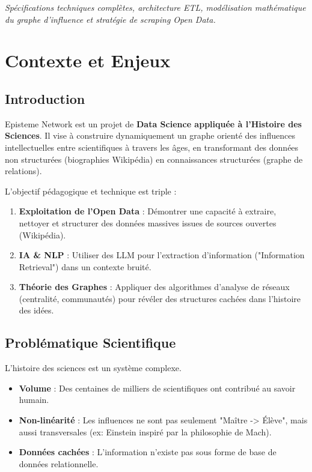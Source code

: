 \documentclass[12pt,a4paper]{report}
\begin{document}
\begin{titlepage}
\begin{center}
    \vfill
    \textit{Spécifications techniques complètes, architecture ETL, modélisation mathématique du graphe d'influence et stratégie de scraping Open Data.}
\end{center}
\end{titlepage}

\newpage
\thispagestyle{empty}
\tableofcontents

\newpage

\chapter{Contexte et Enjeux}

\section{Introduction}
Episteme Network est un projet de \textbf{Data Science appliquée à l'Histoire des Sciences}. Il vise à construire dynamiquement un graphe orienté des influences intellectuelles entre scientifiques à travers les âges, en transformant des données non structurées (biographies Wikipédia) en connaissances structurées (graphe de relations).

L'objectif pédagogique et technique est triple :
\begin{enumerate}
    \item \textbf{Exploitation de l'Open Data} : Démontrer une capacité à extraire, nettoyer et structurer des données massives issues de sources ouvertes (Wikipédia).
    \item \textbf{IA & NLP} : Utiliser des LLM pour l'extraction d'information ("Information Retrieval") dans un contexte bruité.
    \item \textbf{Théorie des Graphes} : Appliquer des algorithmes d'analyse de réseaux (centralité, communautés) pour révéler des structures cachées dans l'histoire des idées.
\end{enumerate}

\section{Problématique Scientifique}
L'histoire des sciences est un système complexe.
\begin{itemize}
    \item \textbf{Volume} : Des centaines de milliers de scientifiques ont contribué au savoir humain.
    \item \textbf{Non-linéarité} : Les influences ne sont pas seulement "Maître -> Élève", mais aussi transversales (ex: Einstein inspiré par la philosophie de Mach).
    \item \textbf{Données cachées} : L'information n'existe pas sous forme de base de données relationnelle.
\end{itemize}
\end{document}

